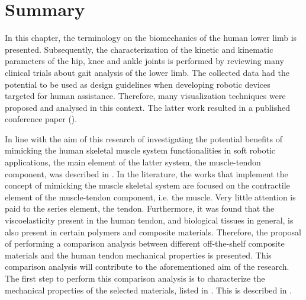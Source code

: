 \section{Summary}

In this chapter, the terminology on the biomechanics of the human lower limb is presented. Subsequently, the characterization of the kinetic and kinematic parameters of the hip, knee and ankle joints is performed by reviewing many clinical trials about gait analysis of the lower limb. The collected data had the potential to be used as design guidelines when developing robotic devices targeted for human assistance. Therefore, many visualization techniques were proposed and analysed in this context. The latter work resulted in a published conference paper (). 

In line with the aim of this research of investigating the potential benefits of mimicking the human skeletal muscle system functionalities in soft robotic applications, the main element of the latter system, the muscle-tendon component, was described in . In the literature, the works that implement the concept of mimicking the muscle skeletal system are focused on the contractile element of the muscle-tendon component, i.e. the muscle. Very little attention is paid to the series element, the tendon. Furthermore, it was found that the viscoelasticity present in the human tendon, and biological tissues in general, is also present in certain polymers and composite materials. Therefore, the proposal of performing a comparison analysis between different off-the-shelf composite materials and the human tendon mechanical properties is presented. This comparison analysis will contribute to the aforementioned aim of the research. The first step to perform this comparison analysis is to characterize the mechanical properties of the selected materials, listed in . This is described in .

